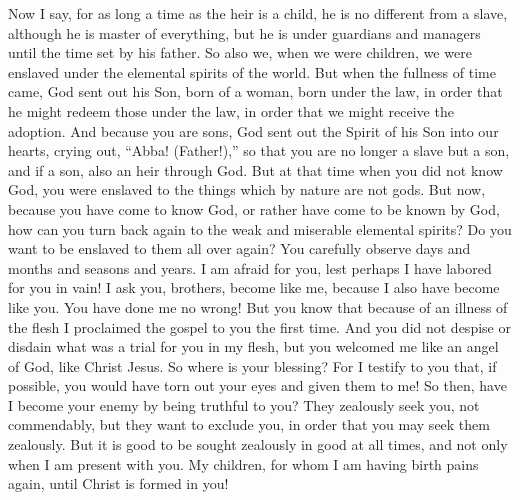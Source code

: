 \begin{biblechapter} %
 Now I say, for as long a time as the heir is a child, he is no different from a slave, although he is master of everything,
\verse but he is under guardians and managers until the time set by his father.
\verse So also we, when we were children, we were enslaved under the elemental spirits of the world.
\verse But when the fullness of time came, God sent out his Son, born of a woman, born under the law,
\verse in order that he might redeem those under the law, in order that we might receive the adoption.
\verse And because you are sons, God sent out the Spirit of his Son into our hearts, crying out, “Abba! (Father!),”
\verse so that you are no longer a slave but a son, and if a son, also an heir through God.
 But at that time when you did not know God, you were enslaved to the things which by nature are not gods.
\verse But now, because you have come to know God, or rather have come to be known by God, how can you turn back again to the weak and miserable elemental spirits? Do you want to be enslaved to them all over again?
\verse You carefully observe days and months and seasons and years.
\verse I am afraid for you, lest perhaps I have labored for you in vain!
\verse I ask you, brothers, become like me, because I also have become like you. You have done me no wrong!
 But you know that because of an illness of the flesh I proclaimed the gospel to you the first time.
\verse And you did not despise or disdain what was a trial for you in my flesh, but you welcomed me like an angel of God, like Christ Jesus.
\verse So where is your blessing? For I testify to you that, if possible, you would have torn out your eyes and given them to me!
\verse So then, have I become your enemy by being truthful to you?
\verse They zealously seek you, not commendably, but they want to exclude you, in order that you may seek them zealously.
\verse But it is good to be sought zealously in good at all times, and not only when I am present with you.
\verse My children, for whom I am having birth pains again, until Christ is formed in you!

\end{biblechapter}

